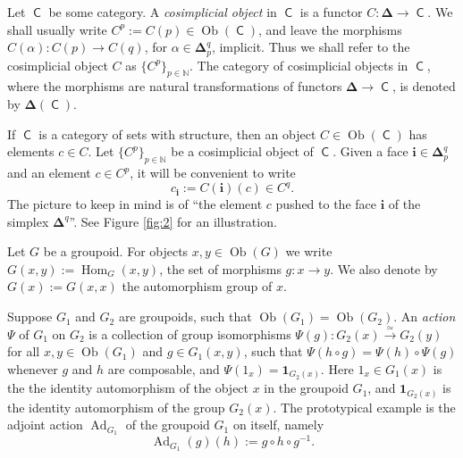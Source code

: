 \documentclass[a4paper,10pt]{amsart}
\theoremstyle{definition}
\numberwithin{equation}{section}
\newcommand{\iso}{\xrightarrow{\simeq}}
\newcommand{\opn}{\operatorname}
\newcommand{\cat}[1]{\operatorname{\mathsf{#1}}}
\newcommand{\mbb}[1]{\mathbb{#1}}
\newcommand{\bsym}[1]{\boldsymbol{#1}}
\begin{document}
Let $\cat{C}$ be some category. A {\em cosimplicial object} in 
$\cat{C}$ is a functor $C : \bsym{\Delta} \to \cat{C}$.
We shall usually write $C^p := C(p) \in \opn{Ob} (\cat{C})$, and leave
the morphisms
$C(\alpha) : C(p) \to C(q)$, for $\alpha \in \bsym{\Delta}^q_p$,
implicit. Thus we shall refer to the cosimplicial object $C$ as
$\{ C^p \}_{p \in \mbb{N}}$.
The category of cosimplicial objects in $\cat{C}$, where the morphisms 
are natural transformations of functors 
$\bsym{\Delta} \to \cat{C}$, is denoted by 
$\bsym{\Delta}(\cat{C})$.

If $\cat{C}$ is a category of sets with structure, then an object 
$C \in \opn{Ob}(\cat{C})$ has elements $c \in C$. 
Let $\{ C^p \}_{p \in \mbb{N}}$ be a cosimplicial object of $\cat{C}$. 
Given a face $\bsym{i} \in \bsym{\Delta}_p^q$
and an element $c \in C^p$, it will be convenient to write
\begin{equation} \label{eqn:101}
c_{\bsym{i}} := C(\bsym{i})(c) \in C^q .
\end{equation}
The picture to keep in mind is of ``the element $c$ pushed to the face
$\bsym{i}$ of the simplex $\bsym{\Delta}^q$''. 
See Figure \ref{fig:2} for an illustration.

Let $G$ be a groupoid. For objects $x, y \in \opn{Ob}(G)$ we
write $G(x,y) := \opn{Hom}_{G}(x, y)$, the set of morphisms
$g : x \to y$. We also denote by $G(x) := G(x, x)$ the automorphism group of
$x$. 

Suppose $G_1$ and $G_2$ are groupoids, such that 
$\opn{Ob}(G_1) = \opn{Ob}(G_2)$. 
An {\em action} $\Psi$ of $G_1$ on 
$G_2$ is a collection of group isomorphisms 
$\Psi(g) : G_2(x) \iso G_2(y)$
for all $x, y \in \opn{Ob}(G_1)$ and $g \in G_1(x, y)$, 
such that 
$\Psi(h \circ g) = \Psi(h) \circ \Psi(g)$
whenever $g$ and $h$ are composable, and 
$\Psi(1_x) = \bsym{1}_{G_2(x)}$. Here $1_x \in G_1(x)$ is the the identity
automorphism of the object $x$ in the groupoid $G_1$, and $\bsym{1}_{G_2(x)}$
is the identity automorphism of the group $G_2(x)$.
The prototypical example is the adjoint action $\opn{Ad}_{G_1}$ of the groupoid
$G_1$ on itself, namely 
\[ \opn{Ad}_{G_1}(g)(h) := g \circ h \circ g^{-1} . \]
\end{document}
